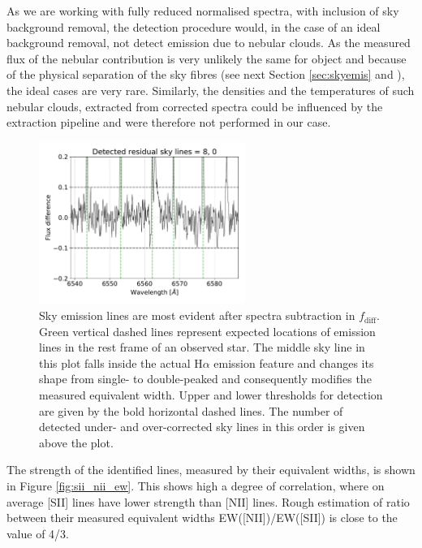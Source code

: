 As we are working with fully reduced normalised spectra, with inclusion of sky background removal, the detection procedure would, in the case of an ideal background removal, not detect emission due to nebular clouds. As the measured flux of the nebular contribution is very unlikely the same for object and because of the physical separation of the sky fibres (see next Section \ref{sec:skyemis} and \citet{2017MNRAS.464.1259K}), the ideal cases are very rare. Similarly, the densities and the temperatures of such nebular clouds, extracted from corrected spectra could be influenced by the extraction pipeline and were therefore not performed in our case. 

\begin{figure}
	\centering
	\includegraphics[width=0.6\textwidth]{paper_170509002201287_2.pdf}
	\caption{Sky emission lines are most evident after spectra subtraction in $f_\mathrm{diff}$. Green vertical dashed lines represent expected locations of emission lines in the rest frame of an observed star. The middle sky line in this plot falls inside the actual H$\alpha$ emission feature and changes its shape from single- to double-peaked and consequently modifies the measured equivalent width. Upper and lower thresholds for detection are given by the bold horizontal dashed lines. The number of detected under- and over-corrected sky lines in this order is given above the plot.}
	\label{fig:skyemiss}
\end{figure}

The strength of the identified lines, measured by their equivalent widths, is shown in Figure \ref{fig:sii_nii_ew}. This shows high a degree of correlation, where on average [SII] lines have lower strength than [NII] lines. Rough estimation of ratio between their measured equivalent widths EW([NII])/EW([SII]) is close to the value of 4/3.

